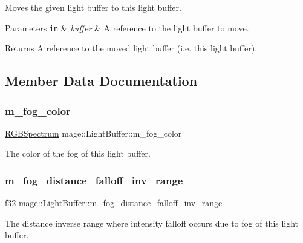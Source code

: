 Moves the given light buffer to this light buffer.


\begin{DoxyParams}[1]{Parameters}
\mbox{\tt in}  & {\em buffer} & A reference to the light buffer to move. \\
\hline
\end{DoxyParams}
\begin{DoxyReturn}{Returns}
A reference to the moved light buffer (i.\+e. this light buffer). 
\end{DoxyReturn}


\subsection{Member Data Documentation}
\hypertarget{structmage_1_1_light_buffer_aa33b98b2880c519eb5be09f78ce4581e}{}\label{structmage_1_1_light_buffer_aa33b98b2880c519eb5be09f78ce4581e} 
\subsubsection{\texorpdfstring{m\+\_\+fog\+\_\+color}{m\_fog\_color}}
{\footnotesize\ttfamily \hyperlink{structmage_1_1_r_g_b_spectrum}{R\+G\+B\+Spectrum} mage\+::\+Light\+Buffer\+::m\+\_\+fog\+\_\+color}

The color of the fog of this light buffer. \hypertarget{structmage_1_1_light_buffer_a46e293e4883664c85cf4597b5d2736fc}{}\label{structmage_1_1_light_buffer_a46e293e4883664c85cf4597b5d2736fc} 
\subsubsection{\texorpdfstring{m\+\_\+fog\+\_\+distance\+\_\+falloff\+\_\+inv\+\_\+range}{m\_fog\_distance\_falloff\_inv\_range}}
{\footnotesize\ttfamily \hyperlink{namespacemage_a6a44ad388483959dc4dff9f2aef91431}{f32} mage\+::\+Light\+Buffer\+::m\+\_\+fog\+\_\+distance\+\_\+falloff\+\_\+inv\+\_\+range}

The distance inverse range where intensity falloff occurs due to fog of this light buffer. \hypertarget{structmage_1_1_light_buffer_ae712ae6ca445249590444e6d05c76de0}{}\label{structmage_1_1_light_buffer_ae712ae6ca445249590444e6d05c76de0} 
